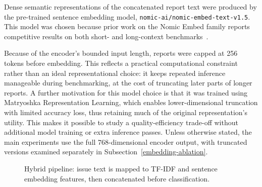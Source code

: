 \documentclass[10pt,a4paper]{article}
\begin{document}
Dense semantic representations of the concatenated report text were produced by the pre-trained sentence embedding model, \texttt{nomic-ai/nomic-embed-text-v1.5}. This model was chosen because prior work on the Nomic Embed family reports competitive results on both short- and long-context benchmarks~\cite{nussbaum_nomic_2025}.

Because of the encoder's bounded input length, reports were capped at 256 tokens before embedding. This reflects a practical computational constraint rather than an ideal representational choice: it keeps repeated inference manageable during benchmarking, at the cost of truncating later parts of longer reports. A further motivation for this model choice is that it was trained using Matryoshka Representation Learning, which enables lower-dimensional truncation with limited accuracy loss, thus retaining much of the original representation's utility. This makes it possible to study a quality-efficiency trade-off without additional model training or extra inference passes. Unless otherwise stated, the main experiments use the full 768-dimensional encoder output, with truncated versions examined separately in Subsection~\ref{embedding-ablation}.

\begin{figure}[h]
\centering
{}
\caption{Hybrid pipeline: issue text is mapped to TF-IDF and sentence embedding features, then concatenated before classification.}\label{fig:hybrid-pipeline}
\end{figure}
\end{document}
